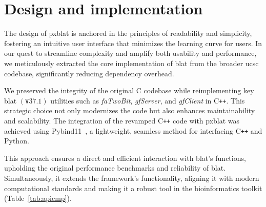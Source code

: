 \documentclass[10pt,letterpaper]{article}
\begin{document}
\section*{Design and implementation}

The design of \gls{pxblat} is anchored in the principles of readability and simplicity, fostering an intuitive user interface that minimizes the learning curve for users.
In our quest to streamline complexity and amplify both usability and performance, we meticulously extracted the core implementation of \gls{blat} from the broader \gls{ucsc} codebase, significantly reducing dependency overhead.

We preserved the integrity of the original C codebase while reimplementing key \gls{blat} \(\left(\mathtt{V}37.1\right)\) utilities such as \emph{faTwoBit}, \emph{gfServer}, and \emph{gfClient} in C\texttt{++}.
This strategic choice not only modernizes the code but also enhances maintainability and scalability.
The integration of the revamped C\texttt{++} code with \gls{pxblat} was achieved using Pybind11~\cite{pybind11}, a lightweight, seamless method for interfacing C\texttt{++} and Python.

This approach ensures a direct and efficient interaction with \gls{blat}'s functions, upholding the original performance benchmarks and reliability of \gls{blat}.
Simultaneously, it extends the framework's functionality, aligning it with modern computational standards and making it a robust tool in the bioinformatics toolkit (Table~\ref{tab:apicmp}).
\end{document}
